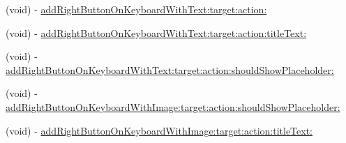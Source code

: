 \begin{Indent}
\begin{DoxyCompactItemize}
\item 
(void) -\/ \mbox{\hyperlink{category_u_i_view_07_i_q_toolbar_addition_08_ab83547e299c6a19d134fb5216f6beb56}{add\+Right\+Button\+On\+Keyboard\+With\+Text\+:target\+:action\+:}}
\item 
(void) -\/ \mbox{\hyperlink{category_u_i_view_07_i_q_toolbar_addition_08_a1f209b6022027c57fbe73ca022a1f055}{add\+Right\+Button\+On\+Keyboard\+With\+Text\+:target\+:action\+:title\+Text\+:}}
\item 
(void) -\/ \mbox{\hyperlink{category_u_i_view_07_i_q_toolbar_addition_08_afd84585c96476e8afc4bce77036605bf}{add\+Right\+Button\+On\+Keyboard\+With\+Text\+:target\+:action\+:should\+Show\+Placeholder\+:}}
\item 
(void) -\/ \mbox{\hyperlink{category_u_i_view_07_i_q_toolbar_addition_08_a8620eaa9f3ac76db2a7f980f631b52a9}{add\+Right\+Button\+On\+Keyboard\+With\+Image\+:target\+:action\+:should\+Show\+Placeholder\+:}}
\item 
(void) -\/ \mbox{\hyperlink{category_u_i_view_07_i_q_toolbar_addition_08_a0424bd7ee3e322412b996ed63fe6e435}{add\+Right\+Button\+On\+Keyboard\+With\+Image\+:target\+:action\+:title\+Text\+:}}
\end{DoxyCompactItemize}
\end{Indent}
